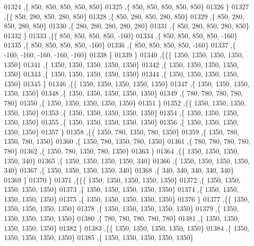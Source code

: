 \begin{DoxyCode}
01324    ,\{   850,   850,   850,   850,   850\}
01325    ,\{   850,   850,   850,   850,   850\}
01326    \}
01327   ,\{\{   850,   280,   850,   280,   850\}
01328    ,\{   850,   280,   850,   280,   850\}
01329    ,\{   850,   280,   850,   280,   850\}
01330    ,\{   280,   280,   280,   280,   280\}
01331    ,\{   850,   280,   850,   280,   850\}
01332    \}
01333   ,\{\{   850,   850,   850,   850,  -160\}
01334    ,\{   850,   850,   850,   850,  -160\}
01335    ,\{   850,   850,   850,   850,  -160\}
01336    ,\{   850,   850,   850,   850,  -160\}
01337    ,\{  -160,  -160,  -160,  -160,  -160\}
01338    \}
01339   \}
01340  ,\{\{\{  1350,  1350,  1350,  1350,  1350\}
01341    ,\{  1350,  1350,  1350,  1350,  1350\}
01342    ,\{  1350,  1350,  1350,  1350,  1350\}
01343    ,\{  1350,  1350,  1350,  1350,  1350\}
01344    ,\{  1350,  1350,  1350,  1350,  1350\}
01345    \}
01346   ,\{\{  1350,  1350,  1350,  1350,  1350\}
01347    ,\{  1350,  1350,  1350,  1350,  1350\}
01348    ,\{  1350,  1350,  1350,  1350,  1350\}
01349    ,\{   780,   780,   780,   780,   780\}
01350    ,\{  1350,  1350,  1350,  1350,  1350\}
01351    \}
01352   ,\{\{  1350,  1350,  1350,  1350,  1350\}
01353    ,\{  1350,  1350,  1350,  1350,  1350\}
01354    ,\{  1350,  1350,  1350,  1350,  1350\}
01355    ,\{  1350,  1350,  1350,  1350,  1350\}
01356    ,\{  1350,  1350,  1350,  1350,  1350\}
01357    \}
01358   ,\{\{  1350,   780,  1350,   780,  1350\}
01359    ,\{  1350,   780,  1350,   780,  1350\}
01360    ,\{  1350,   780,  1350,   780,  1350\}
01361    ,\{   780,   780,   780,   780,   780\}
01362    ,\{  1350,   780,  1350,   780,  1350\}
01363    \}
01364   ,\{\{  1350,  1350,  1350,  1350,   340\}
01365    ,\{  1350,  1350,  1350,  1350,   340\}
01366    ,\{  1350,  1350,  1350,  1350,   340\}
01367    ,\{  1350,  1350,  1350,  1350,   340\}
01368    ,\{   340,   340,   340,   340,   340\}
01369    \}
01370   \}
01371  ,\{\{\{  1350,  1350,  1350,  1350,  1350\}
01372    ,\{  1350,  1350,  1350,  1350,  1350\}
01373    ,\{  1350,  1350,  1350,  1350,  1350\}
01374    ,\{  1350,  1350,  1350,  1350,  1350\}
01375    ,\{  1350,  1350,  1350,  1350,  1350\}
01376    \}
01377   ,\{\{  1350,  1350,  1350,  1350,  1350\}
01378    ,\{  1350,  1350,  1350,  1350,  1350\}
01379    ,\{  1350,  1350,  1350,  1350,  1350\}
01380    ,\{   780,   780,   780,   780,   780\}
01381    ,\{  1350,  1350,  1350,  1350,  1350\}
01382    \}
01383   ,\{\{  1350,  1350,  1350,  1350,  1350\}
01384    ,\{  1350,  1350,  1350,  1350,  1350\}
01385    ,\{  1350,  1350,  1350,  1350,  1350\}

\end{DoxyCode}
